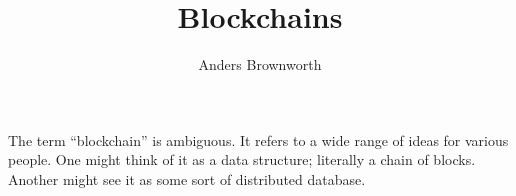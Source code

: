 \documentclass[ebook,12pt,oneside,openany]{memoir}
\title{Blockchains}
\author{Anders Brownworth}
\begin{document}
\maketitle

The term ``blockchain'' is ambiguous.
It refers to a wide range of ideas for various people.
One might think of it as a data structure; literally a chain of blocks.
Another might see it as some sort of distributed database.
\end{document}
